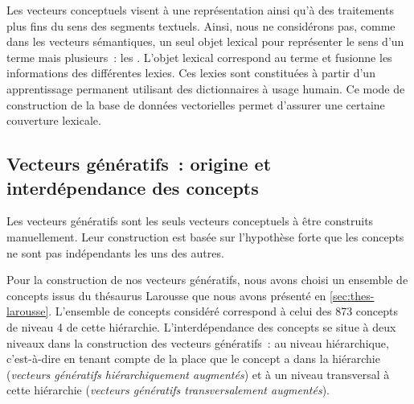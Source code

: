 Les vecteurs conceptuels visent à une
représentation ainsi qu'à des traitements plus fins du sens des
segments textuels. Ainsi, nous ne considérons pas, comme dans les
vecteurs sémantiques, un seul objet
lexical pour représenter le sens d'un terme mais plusieurs~: les
. L'objet lexical  correspond au
terme et fusionne les informations des différentes lexies. Ces lexies
sont constituées à partir d'un apprentissage permanent utilisant des
dictionnaires à usage humain. Ce mode de construction de la base de
données vectorielles permet d'assurer une certaine couverture
lexicale.



\subsection{Vecteurs génératifs~: origine et interdépendance des concepts}\label{sec:vect-gener-VC}

 Les vecteurs génératifs sont les seuls
vecteurs conceptuels à être construits manuellement.  Leur
construction est basée sur l'hypothèse forte que les concepts ne sont
pas indépendants les uns des autres.

Pour la construction de nos vecteurs génératifs, nous avons choisi un
ensemble de concepts issus du thésaurus Larousse \cite{Thesaurus1992}
que nous avons présenté en \ref{sec:thes-larousse}. L'ensemble de
concepts considéré correspond à celui des 873 concepts de niveau 4 de
cette hiérarchie.  L'interdépendance des concepts se situe à deux
niveaux dans la construction des vecteurs génératifs~: au niveau
hiérarchique, c'est-à-dire en tenant compte de la place que le concept
a dans la hiérarchie (\emph{vecteurs génératifs hiérarchiquement
  augmentés}) et à un niveau transversal à cette hiérarchie
(\emph{vecteurs génératifs transversalement augmentés}).

